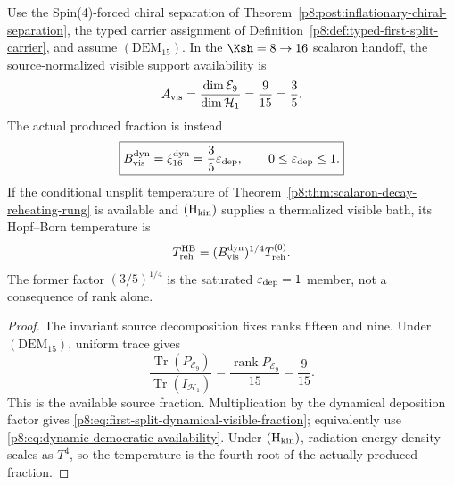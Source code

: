 \documentclass[12pt,a4paper]{article}
\begin{document}
\begin{theorem}
\label{p8:thm:first-split-reheating-visibility}
Use the Spin(4)-forced chiral separation of
Theorem~\ref{p8:post:inflationary-chiral-separation}, the typed carrier
assignment of Definition~\ref{p8:def:typed-first-split-carrier}, and assume
\((\mathrm{DEM}_{15})\).  In the \(\Ksh=8\to16\) scalaron handoff, the
source-normalized visible support availability is
\[
A_{\rm vis}
=
\frac{\dim \mathcal E_9}{\dim \mathcal H_1}
=
\frac{9}{15}
=
\frac35.
\]
The actual produced fraction is instead
\begin{equation}
 \label{p8:eq:first-split-dynamical-visible-fraction}
 \boxed{B_{\rm vis}^{\rm dyn}=\xi_{16}^{\rm dyn}
 =\frac35\varepsilon_{\rm dep},
 \qquad0\le\varepsilon_{\rm dep}\le1.}
\end{equation}
If the conditional unsplit temperature of
Theorem~\ref{p8:thm:scalaron-decay-reheating-rung} is available and
\((\mathrm H_{\rm kin})\) supplies a thermalized visible bath, its
Hopf--Born temperature is
\begin{equation}
\label{p8:eq:Treh-HB-first-split}
T_{\rm reh}^{\rm HB}
=
(B_{\rm vis}^{\rm dyn})^{1/4}T_{\rm reh}^{(0)}.
\end{equation}
The former factor \((3/5)^{1/4}\) is the saturated
\(\varepsilon_{\rm dep}=1\) member, not a consequence of rank alone.
\end{theorem}

\begin{proof}
The invariant source decomposition fixes ranks fifteen and nine.  Under
\((\mathrm{DEM}_{15})\), uniform trace gives
\[
\frac{\operatorname{Tr}(P_{\mathcal E_9})}
     {\operatorname{Tr}(I_{\mathcal H_1})}
=\frac{\operatorname{rank}P_{\mathcal E_9}}{15}=\frac9{15}.
\]
This is the available source fraction.  Multiplication by the dynamical
deposition factor gives \eqref{p8:eq:first-split-dynamical-visible-fraction};
equivalently use \eqref{p8:eq:dynamic-democratic-availability}.  Under
\((\mathrm H_{\rm kin})\), radiation energy density scales as \(T^4\), so the
temperature is the fourth root of the actually produced fraction.
\end{proof}
\end{document}
